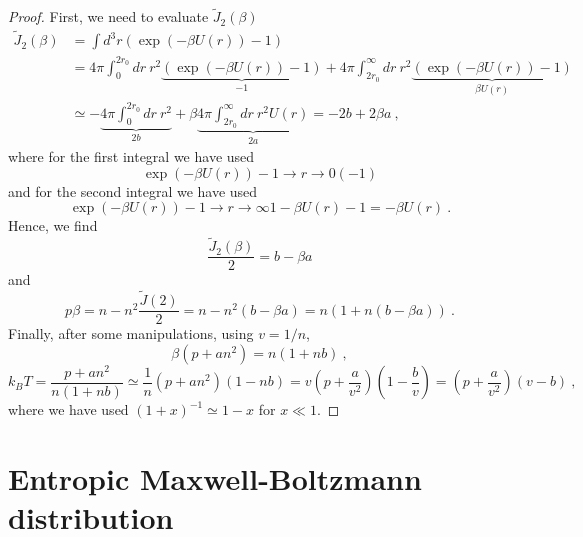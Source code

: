     \begin{proof}
        First, we need to evaluate $\tilde J_2 (\beta)$ 
        \begin{equation*}
        \begin{aligned}
            \tilde J_2 (\beta) & = \int d^3 r (\exp(- \beta U(r)) - 1) \\ & = 4 \pi \int_0^{2r_0} dr ~ r^2 \underbrace{(\exp(- \beta U(r)) - 1)}_{-1} + 4\pi \int_{2r_0}^\infty dr ~ r^2\underbrace{(\exp(- \beta U(r)) - 1)}_{\beta U(r)} \\ & \simeq - \underbrace{4 \pi \int_0^{2r_0} dr ~ r^2}_{2b} + \beta \underbrace{4\pi \int_{2r_0}^\infty dr ~ r^2 U(r)}_{2 a} = - 2 b + 2 \beta a ~,
        \end{aligned}
        \end{equation*}
        where for the first integral we have used 
        \begin{equation*}
            \exp(-\beta U(r)) - 1 \rightarrow{r \rightarrow 0} (-1) 
        \end{equation*}
        and for the second integral we have used 
        \begin{equation*}
            \exp(-\beta U(r)) - 1 \rightarrow{r \rightarrow \infty} 1 - \beta U(r) - 1 = - \beta U(r) ~.
        \end{equation*}
        Hence, we find
        \begin{equation*}
            \frac{\tilde J_2(\beta)}{2} = b - \beta a 
        \end{equation*}
        and 
        \begin{equation*}
            p \beta = n - n^2 \frac{\tilde J(2)}{2} = n - n^2 (b - \beta a) = n( 1 + n (b - \beta a)) ~.
        \end{equation*}
        Finally, after some manipulations, using $v = 1 / n$,
        \begin{equation*}
            \beta (p + a n^2) = n (1 + n b) ~,
        \end{equation*}
        \begin{equation*}
            k_B T = \frac{p + a n^2}{n (1 + n b)} \simeq \frac{1}{n}(p + a n^2) (1 - n b) = v (p + \frac{a}{v^2}) (1 - \frac{b}{v}) = (p + \frac{a}{v^2}) (v - b) ~,
        \end{equation*}
        where we have used $(1 + x)^{-1} \simeq 1 - x$ for $x \ll 1$.
    \end{proof}

\section{Entropic Maxwell-Boltzmann distribution}

